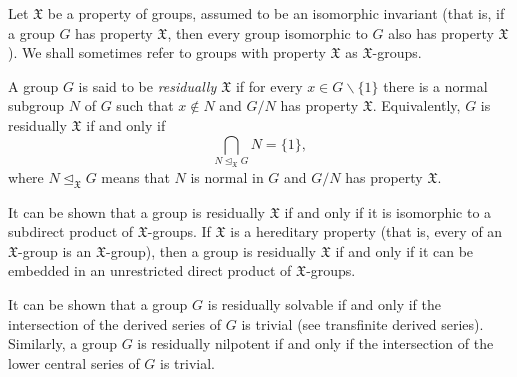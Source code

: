 \documentclass[12pt]{article}
\def\normal{\trianglelefteq}
\def\X{\mathfrak{X}}
\begin{document}

Let $\X$ be a property of groups,
assumed to be an isomorphic invariant
(that is, if a group $G$ has property $\X$,
then every group isomorphic to $G$ also has property $\X$).
We shall sometimes refer to groups with property $\X$ as $\X$-groups.

A group $G$ is said to be \emph{residually $\X$}
if for every $x\in G\backslash\{1\}$ there is a normal subgroup $N$ of $G$
such that $x\notin N$ and $G/N$ has property $\X$.
Equivalently, $G$ is residually $\X$ if and only if
\[
  \bigcap_{N\normal_\X G}\!\!N=\{1\},
\]
where $N\normal_\X G$ means that
$N$ is normal in $G$ and $G/N$ has property $\X$.

It can be shown that a group is residually $\X$
if and only if it is isomorphic to a subdirect product of $\X$-groups.
If $\X$ is a hereditary property 
(that is, every  of an $\X$-group is an $\X$-group),
then a group is residually $\X$ if and only if
it can be embedded in an unrestricted direct product of $\X$-groups.

It can be shown that a group $G$ is residually solvable if and only if
the intersection of the derived series of $G$ is trivial
(see transfinite derived series).
Similarly, a group $G$ is residually nilpotent if and only if
the intersection of the lower central series of $G$ is trivial.
\end{document}
